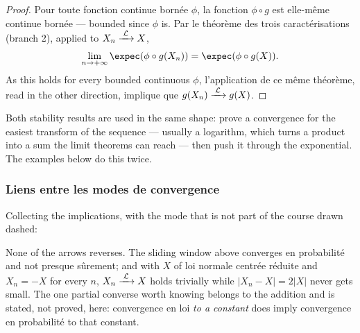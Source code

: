 \begin{proof}
  Pour toute fonction continue bornée $\phi$, la fonction $\phi \circ g$ est
  elle-même continue bornée --- bounded since $\phi$ is. Par le théorème des
  trois caractérisations (branch 2), applied to $X_{n} \xrightarrow{\;\mathcal{L}\;} X$,
  \[
    \lim_{n \to +\infty} \expec(\phi \circ g(X_{n}))
      = \expec(\phi \circ g(X)) .
  \]
  As this holds for every bounded continuous $\phi$, l'application de ce même
  théorème, read in the other direction, implique que $g(X_{n}) \xrightarrow{\;\mathcal{L}\;} g(X)$.
\end{proof}

\begin{remark}
  Both stability results are used in the same shape: prove a convergence for the
  easiest transform of the sequence --- usually a logarithm, which turns a
  product into a sum the limit theorems can reach --- then push it through the
  exponential. The examples below do this twice.
\end{remark}

\subsubsection{Liens entre les modes de convergence}
Collecting the implications, with the mode that is not part of the course drawn
dashed:

\begin{figure}[h!]
  \centering
\end{figure}

\begin{remark}
  None of the arrows reverses. The sliding window above converges en
  probabilité and not presque sûrement; and with $X$ of loi normale centrée
  réduite and $X_{n} = -X$ for every $n$, $X_{n} \xrightarrow{\;\mathcal{L}\;} X$ holds trivially while
  $|X_{n} - X| = 2|X|$ never gets small. The one partial converse worth knowing
  belongs to the addition and is stated, not proved, here: convergence en loi
  \emph{to a constant} does imply convergence en probabilité to that constant.
\end{remark}

